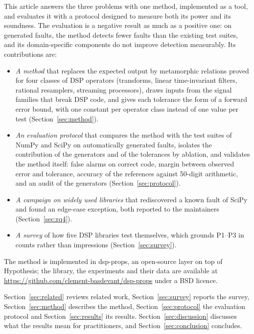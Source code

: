 \documentclass[10pt,conference]{IEEEtran}
\begin{document}
This article answers the three problems with one method, implemented as a
tool, and evaluates it with a protocol designed to measure both its power and
its soundness. The evaluation is a negative result as much as a positive one:
on generated faults, the method detects fewer faults than the existing test
suites, and its domain-specific components do not improve detection
measurably. Its contributions are:
\begin{itemize}
\item \emph{A method} that replaces the expected output by metamorphic relations
proved for four classes of DSP operators (transforms, linear time-invariant
filters, rational resamplers, streaming processors), draws inputs from the
signal families that break DSP code, and gives each tolerance the form of a
forward error bound, with one constant per operator class instead of one value
per test (Section~\ref{sec:method}).
\item \emph{An evaluation protocol} that compares the method with the test
suites of NumPy and SciPy on automatically generated faults, isolates the
contribution of the generators and of the tolerances by ablation, and validates
the method itself: false alarms on correct code, margin between observed error
and tolerance, accuracy of the references against 50-digit arithmetic, and an
audit of the generators (Section~\ref{sec:protocol}).
\item \emph{A campaign on widely used libraries} that rediscovered a known
fault of SciPy and found an edge-case exception, both reported to the
maintainers (Section~\ref{sec:rq4}).
\item \emph{A survey} of how five DSP libraries test themselves, which grounds
P1--P3 in counts rather than impressions (Section~\ref{sec:survey}).
\end{itemize}
The method is implemented in dsp-props, an open-source layer on top of
Hypothesis; the library, the experiments and their data are available at
\url{https://github.com/clement-basdevant/dsp-props} under a BSD licence.

Section~\ref{sec:related} reviews related work, Section~\ref{sec:survey}
reports the survey, Section~\ref{sec:method} describes the method,
Section~\ref{sec:protocol} the evaluation protocol and Section~\ref{sec:results}
its results. Section~\ref{sec:discussion} discusses what the results mean for
practitioners, and Section~\ref{sec:conclusion} concludes.

\end{document}
